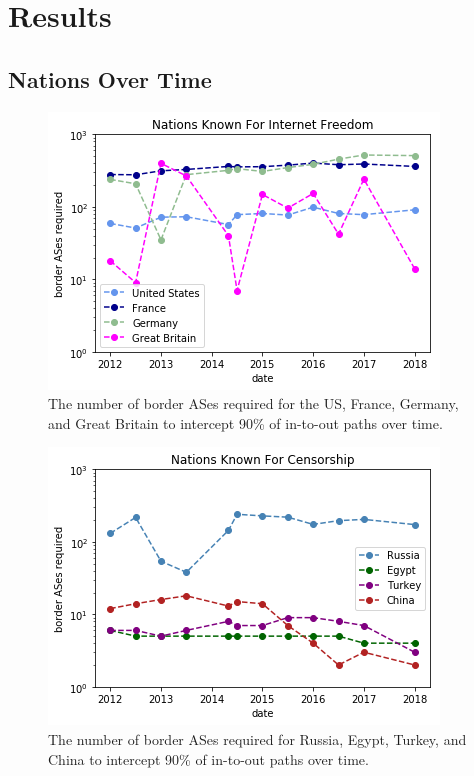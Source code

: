 \documentclass[10pt, conference, letterpaper]{IEEEtran}
\begin{document}
\section{Results}
\subsection{Nations Over Time}

\begin{figure}
	\centering
	\includegraphics[width=\linewidth]{NodesFree}
	\caption{The number of border ASes required for the US, France, Germany, and Great Britain to intercept 90\% of in-to-out paths over time.}\label{fig:nodesFree}
\end{figure}
\begin{figure}
	\centering
	\includegraphics[width=\linewidth]{NodesCensor}
	\caption{The number of border ASes required for Russia, Egypt, Turkey, and China to intercept 90\% of in-to-out paths over time.}\label{fig:nodesCensor}
\end{figure}
\end{document}
